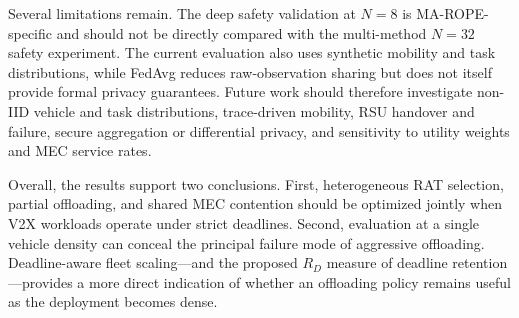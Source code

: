 Several limitations remain. The deep safety validation at $N=8$ is MA-ROPE-specific and should not be directly compared with the multi-method $N=32$ safety experiment. The current evaluation also uses synthetic mobility and task distributions, while FedAvg reduces raw-observation sharing but does not itself provide formal privacy guarantees. Future work should therefore investigate non-IID vehicle and task distributions, trace-driven mobility, RSU handover and failure, secure aggregation or differential privacy, and sensitivity to utility weights and MEC service rates.

Overall, the results support two conclusions. First, heterogeneous RAT selection, partial offloading, and shared MEC contention should be optimized jointly when V2X workloads operate under strict deadlines. Second, evaluation at a single vehicle density can conceal the principal failure mode of aggressive offloading. Deadline-aware fleet scaling---and the proposed $R_D$ measure of deadline retention---provides a more direct indication of whether an offloading policy remains useful as the deployment becomes dense.
